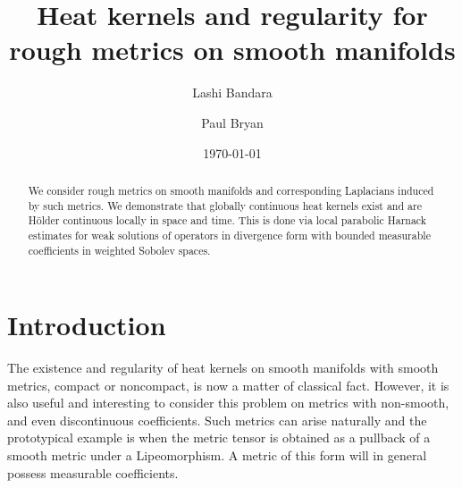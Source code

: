 \documentclass[a4paper, 12pt]{amsart}
\begin{document}
\title[Heat kernels and regularity for rough metrics]{Heat kernels and regularity for rough metrics on smooth manifolds}

\author{Lashi Bandara}
\author{Paul Bryan}

\address{Lashi Bandara, 
Institut für Mathematik,
Universität Potsdam, 
D-14476, Potsdam OT Golm, Germany
}

\address{Paul Bryan, 
Department of Mathematics
Macquarie University 
NSW, 2109, Australia
}



\curraddr{}
\email{}
\date{\today}

\dedicatory{}

\maketitle

\begin{abstract}
We consider rough metrics on smooth manifolds and corresponding Laplacians induced by such metrics.
We demonstrate  that globally continuous heat kernels exist and are Hölder continuous locally in space and time. 
This is done via local parabolic Harnack estimates for weak
solutions of operators in divergence form with bounded measurable coefficients 
in weighted Sobolev spaces.
\end{abstract}

\setcounter{tocdepth}{1}
\tableofcontents

\parindent0cm
\setlength{\parskip}{\baselineskip}



\section{Introduction}
\label{sec:intro}
The existence and regularity of heat kernels on smooth manifolds with smooth metrics, compact or noncompact, 
is now a matter of classical fact. 
However, it is also useful and interesting to consider this problem on
metrics with non-smooth, and even discontinuous coefficients. 
Such metrics can arise naturally and the prototypical example 
is when the metric tensor is obtained as a pullback of a smooth metric under a 
Lipeomorphism. A metric of this form will in general possess measurable
coefficients.
\end{document}
